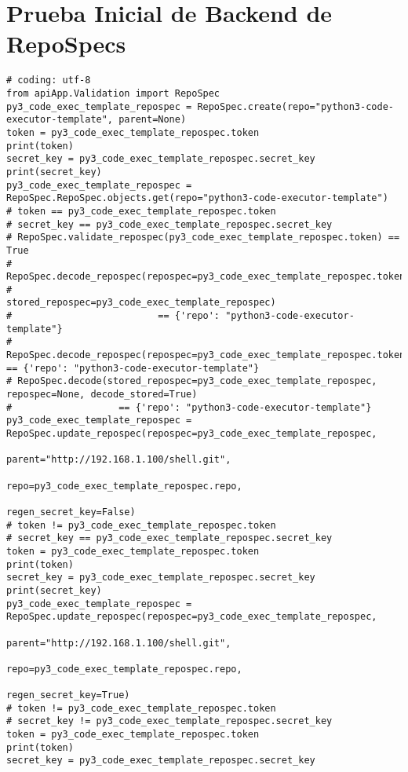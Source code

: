 \section{Prueba Inicial de Backend de RepoSpecs}
\lstset{language=Python}
\begin{lstlisting}[breaklines]
# coding: utf-8
from apiApp.Validation import RepoSpec
py3_code_exec_template_repospec = RepoSpec.create(repo="python3-code-executor-template", parent=None)
token = py3_code_exec_template_repospec.token
print(token)
secret_key = py3_code_exec_template_repospec.secret_key
print(secret_key)
py3_code_exec_template_repospec = RepoSpec.RepoSpec.objects.get(repo="python3-code-executor-template")
# token == py3_code_exec_template_repospec.token
# secret_key == py3_code_exec_template_repospec.secret_key
# RepoSpec.validate_repospec(py3_code_exec_template_repospec.token) == True
# RepoSpec.decode_repospec(repospec=py3_code_exec_template_repospec.token,
#                          stored_repospec=py3_code_exec_template_repospec)
#                          == {'repo': "python3-code-executor-template"}
# RepoSpec.decode_repospec(repospec=py3_code_exec_template_repospec.token) == {'repo': "python3-code-executor-template"}
# RepoSpec.decode(stored_repospec=py3_code_exec_template_repospec, repospec=None, decode_stored=True)
#                   == {'repo': "python3-code-executor-template"}
py3_code_exec_template_repospec = RepoSpec.update_repospec(repospec=py3_code_exec_template_repospec,
                                                           parent="http://192.168.1.100/shell.git",
                                                           repo=py3_code_exec_template_repospec.repo,
                                                           regen_secret_key=False)
# token != py3_code_exec_template_repospec.token
# secret_key == py3_code_exec_template_repospec.secret_key
token = py3_code_exec_template_repospec.token
print(token)
secret_key = py3_code_exec_template_repospec.secret_key
print(secret_key)
py3_code_exec_template_repospec = RepoSpec.update_repospec(repospec=py3_code_exec_template_repospec,
                                                           parent="http://192.168.1.100/shell.git",
                                                           repo=py3_code_exec_template_repospec.repo,
                                                           regen_secret_key=True)
# token != py3_code_exec_template_repospec.token
# secret_key != py3_code_exec_template_repospec.secret_key
token = py3_code_exec_template_repospec.token
print(token)
secret_key = py3_code_exec_template_repospec.secret_key

\end{lstlisting}
